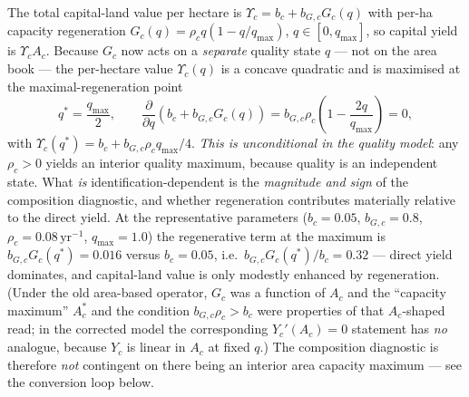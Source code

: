 \documentclass[11pt]{article}
\begin{document}
The total capital-land value per hectare is $\Upsilon_c=b_c+b_{G,c}G_c(q)$ with per-ha capacity regeneration $G_c(q)=\rho_c q(1-q/q_{\max})$, $q\in[0,q_{\max}]$, so capital yield is $\Upsilon_c A_c$. Because $G_c$ now acts on a \emph{separate} quality state $q$ --- not on the area book --- the per-hectare value $\Upsilon_c(q)$ is a concave quadratic and is maximised at the maximal-regeneration point
\[
q^*=\frac{q_{\max}}{2},\qquad \frac{\partial}{\partial q}\left(b_c+b_{G,c}G_c(q)\right)=b_{G,c}\rho_c\left(1-\frac{2q}{q_{\max}}\right)=0,
\]
with $\Upsilon_c(q^*)=b_c+b_{G,c}\rho_c q_{\max}/4$. \emph{This is unconditional in the quality model}: any $\rho_c>0$ yields an interior quality maximum, because quality is an independent state. What \emph{is} identification-dependent is the \emph{magnitude and sign} of the composition diagnostic, and whether regeneration contributes materially relative to the direct yield. At the representative parameters ($b_c=0.05$, $b_{G,c}=0.8$, $\rho_c=0.08\,\text{yr}^{-1}$, $q_{\max}=1.0$) the regenerative term at the maximum is $b_{G,c}G_c(q^*)=0.016$ versus $b_c=0.05$, i.e.\ $b_{G,c}G_c(q^*)/b_c=0.32$ --- direct yield dominates, and capital-land value is only modestly enhanced by regeneration. (Under the old area-based operator, $G_c$ was a function of $A_c$ and the ``capacity maximum'' $A_c^*$ and the condition $b_{G,c}\rho_c>b_c$ were properties of that $A_c$-shaped read; in the corrected model the corresponding $Y_c'(A_c)=0$ statement has \emph{no} analogue, because $Y_c$ is linear in $A_c$ at fixed $q$.) The composition diagnostic is therefore \emph{not} contingent on there being an interior area capacity maximum --- see the conversion loop below.
\end{document}
